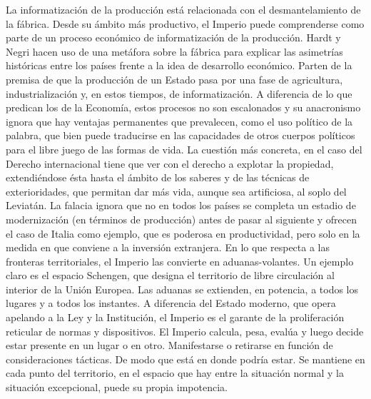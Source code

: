 La informatización de la producción está relacionada con el desmantelamiento de la fábrica. Desde su ámbito más productivo, el Imperio puede comprenderse como parte de un proceso económico de informatización de la producción. Hardt y Negri hacen uso de una metáfora sobre la fábrica para explicar las asimetrías históricas entre los países frente a la idea de desarrollo económico. Parten de la premisa de que la producción de un Estado pasa por una fase de agricultura, industrialización y, en estos tiempos, de informatización. A diferencia de lo que predican los  de la Economía, estos procesos no son escalonados y su anacronismo ignora que hay ventajas permanentes que prevalecen, como el uso político de la palabra, que bien puede traducirse en las capacidades de otros cuerpos políticos para el libre juego de las formas de vida. La cuestión más concreta, en el caso del Derecho internacional tiene que ver con el derecho a explotar la propiedad, extendiéndose ésta hasta el ámbito de los saberes y de las técnicas de exterioridades, que permitan dar más vida, aunque sea artificiosa, al soplo del Leviatán. La falacia ignora que no en todos los países se completa un estadio de modernización (en términos de producción) antes de pasar al siguiente y ofrecen el caso de Italia como ejemplo, que es poderosa en productividad, pero solo en la medida en que conviene a la inversión extranjera. En lo que respecta a las fronteras territoriales, el Imperio las convierte en aduanas-volantes. Un ejemplo claro es el espacio Schengen, que designa el territorio de libre circulación al interior de la Unión Europea. Las aduanas se extienden, en potencia, a todos los lugares y a todos los instantes. A diferencia del Estado moderno, que opera apelando a la Ley y la Institución, el Imperio es el garante de la proliferación reticular de normas y dispositivos. El Imperio calcula, pesa, evalúa y luego decide estar presente en un lugar o en otro. Manifestarse o retirarse en función de consideraciones tácticas. De modo que está en donde podría estar. Se mantiene en cada punto del territorio, en el espacio que hay entre la situación normal y la situación excepcional, puede su propia impotencia.

